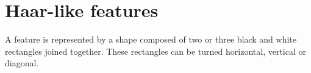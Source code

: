 \documentclass{article}
\begin{document}
%

\section{Haar-like features}
A feature is represented by a shape composed of two or three black and white rectangles joined together. These rectangles can be turned horizontal, vertical or diagonal.
\label{sec:format}
\end{document}
